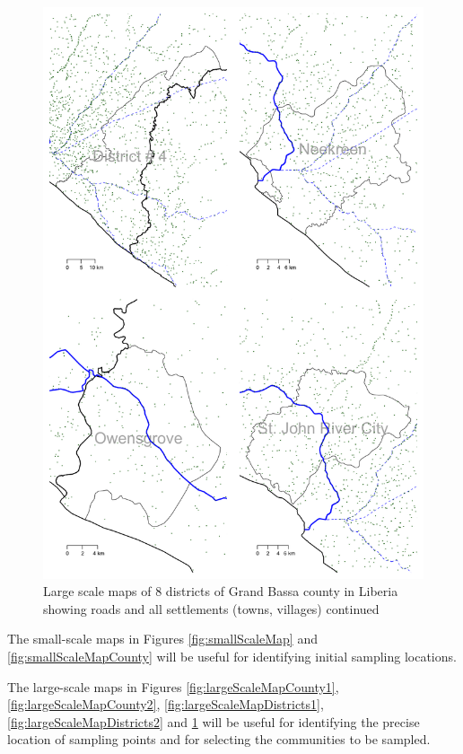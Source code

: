 \documentclass[12pt,a4paper]{book}
\theoremstyle{definition}
\theoremstyle{definition}
\theoremstyle{definition}
\theoremstyle{remark}
\begin{document}
\begin{figure}[H]

{\centering \includegraphics{figures/largeScaleMapDistricts3-1} 

}

\caption{Large scale maps of 8 districts of Grand Bassa county in Liberia showing roads and all settlements (towns, villages) continued}\label{fig:largeScaleMapDistricts3}
\end{figure}

\newpage

The small-scale maps in Figures \ref{fig:smallScaleMap} and
\ref{fig:smallScaleMapCounty} will be useful for identifying initial
sampling locations.

The large-scale maps in Figures \ref{fig:largeScaleMapCounty1},
\ref{fig:largeScaleMapCounty2}, \ref{fig:largeScaleMapDistricts1},
\ref{fig:largeScaleMapDistricts2} and \ref{fig:largeScaleMapDistricts3}
will be useful for identifying the precise location of sampling points
and for selecting the communities to be sampled.
\end{document}
